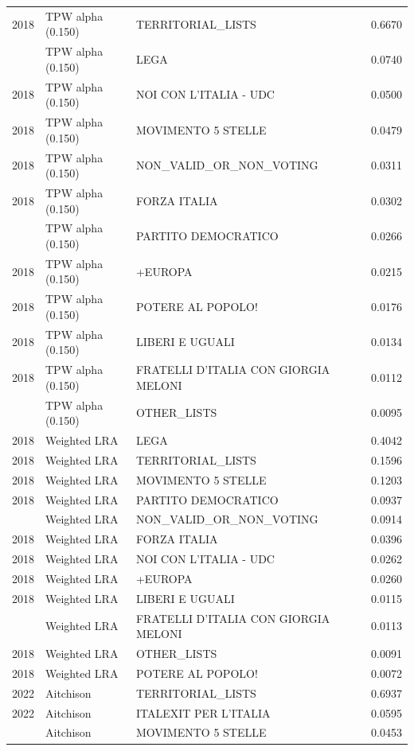 \begin{longtable}[t]{rllr}
2018 & TPW alpha (0.150) & TERRITORIAL\_LISTS & 0.6670\\
\addlinespace
2018 & TPW alpha (0.150) & LEGA & 0.0740\\
2018 & TPW alpha (0.150) & NOI CON L'ITALIA - UDC & 0.0500\\
2018 & TPW alpha (0.150) & MOVIMENTO 5 STELLE & 0.0479\\
2018 & TPW alpha (0.150) & NON\_VALID\_OR\_NON\_VOTING & 0.0311\\
2018 & TPW alpha (0.150) & FORZA ITALIA & 0.0302\\
\addlinespace
2018 & TPW alpha (0.150) & PARTITO DEMOCRATICO & 0.0266\\
2018 & TPW alpha (0.150) & +EUROPA & 0.0215\\
2018 & TPW alpha (0.150) & POTERE AL POPOLO! & 0.0176\\
2018 & TPW alpha (0.150) & LIBERI E UGUALI & 0.0134\\
2018 & TPW alpha (0.150) & FRATELLI D'ITALIA CON GIORGIA MELONI & 0.0112\\
\addlinespace
2018 & TPW alpha (0.150) & OTHER\_LISTS & 0.0095\\
2018 & Weighted LRA & LEGA & 0.4042\\
2018 & Weighted LRA & TERRITORIAL\_LISTS & 0.1596\\
2018 & Weighted LRA & MOVIMENTO 5 STELLE & 0.1203\\
2018 & Weighted LRA & PARTITO DEMOCRATICO & 0.0937\\
\addlinespace
2018 & Weighted LRA & NON\_VALID\_OR\_NON\_VOTING & 0.0914\\
2018 & Weighted LRA & FORZA ITALIA & 0.0396\\
2018 & Weighted LRA & NOI CON L'ITALIA - UDC & 0.0262\\
2018 & Weighted LRA & +EUROPA & 0.0260\\
2018 & Weighted LRA & LIBERI E UGUALI & 0.0115\\
\addlinespace
2018 & Weighted LRA & FRATELLI D'ITALIA CON GIORGIA MELONI & 0.0113\\
2018 & Weighted LRA & OTHER\_LISTS & 0.0091\\
2018 & Weighted LRA & POTERE AL POPOLO! & 0.0072\\
2022 & Aitchison & TERRITORIAL\_LISTS & 0.6937\\
2022 & Aitchison & ITALEXIT PER L'ITALIA & 0.0595\\
\addlinespace
2022 & Aitchison & MOVIMENTO 5 STELLE & 0.0453\\

\end{longtable}
